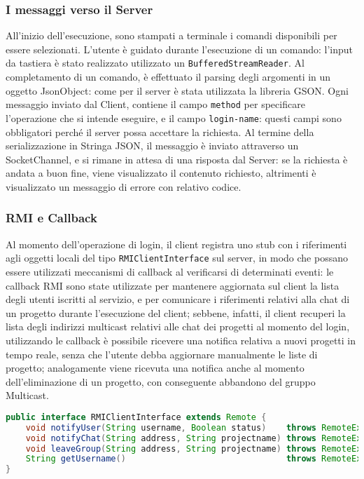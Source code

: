 \documentclass{article}
\begin{document}
\subsubsection{I messaggi verso il Server}
All'inizio dell'esecuzione, sono stampati a terminale i comandi disponibili per essere selezionati. L'utente è guidato durante l'esecuzione di un comando: l'input da tastiera è stato realizzato utilizzato un \texttt{BufferedStreamReader}. Al completamento di un comando, è effettuato il parsing degli argomenti in un oggetto JsonObject: come per il server è stata utilizzata la libreria GSON. Ogni messaggio inviato dal Client, contiene il campo \texttt{method} per specificare l'operazione che si intende eseguire, e il campo \texttt{login-name}: questi campi sono obbligatori perché il server possa accettare la richiesta. Al termine della serializzazione in Stringa JSON, il messaggio è inviato attraverso un SocketChannel, e si rimane in attesa di una risposta dal Server: se la richiesta è andata a buon fine, viene visualizzato il contenuto richiesto, altrimenti è visualizzato un messaggio di errore con relativo codice.

\subsubsection{RMI e Callback}
Al momento dell'operazione di login, il client registra uno stub con i riferimenti agli oggetti locali del tipo \texttt{RMIClientInterface} sul server, in modo che possano essere utilizzati meccanismi di callback al verificarsi di determinati eventi: le callback RMI sono state utilizzate per mantenere aggiornata sul client la lista degli utenti iscritti al servizio, e per comunicare i riferimenti relativi alla chat di un progetto durante l'esecuzione del client; sebbene, infatti, il client recuperi la lista degli indirizzi multicast relativi alle chat dei progetti al momento del login, utilizzando le callback è possibile ricevere una notifica relativa a nuovi progetti in tempo reale, senza che l'utente debba aggiornare manualmente le liste di progetto; analogamente viene ricevuta una notifica anche al momento dell'eliminazione di un progetto, con conseguente abbandono del gruppo Multicast.\newline

\begin{lstlisting}[language=Java, caption=Interfaccia \texttt{RMIClientInterface.java}]
public interface RMIClientInterface extends Remote {
    void notifyUser(String username, Boolean status)    throws RemoteException;
    void notifyChat(String address, String projectname) throws RemoteException;
    void leaveGroup(String address, String projectname) throws RemoteException;
    String getUsername()                                throws RemoteException;
}
\end{lstlisting}
\end{document}
